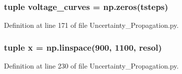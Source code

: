 \hypertarget{namespace_uncertainty___propagation_ad561e9e5b642db23d892d0aaf51d02d6}{
\subsubsection[{voltage\-\_\-curves}]{\setlength{\rightskip}{0pt plus 5cm}tuple voltage\-\_\-curves = np.\-zeros(tsteps)}}\label{namespace_uncertainty___propagation_ad561e9e5b642db23d892d0aaf51d02d6}


Definition at line 171 of file Uncertainty\-\_\-\-Propagation.\-py.

\hypertarget{namespace_uncertainty___propagation_a7a74e6f2f6355f34b63513f77c839a9e}{
\subsubsection[{x}]{\setlength{\rightskip}{0pt plus 5cm}tuple x = np.\-linspace(900, 1100, {\bf resol})}}\label{namespace_uncertainty___propagation_a7a74e6f2f6355f34b63513f77c839a9e}


Definition at line 230 of file Uncertainty\-\_\-\-Propagation.\-py.

